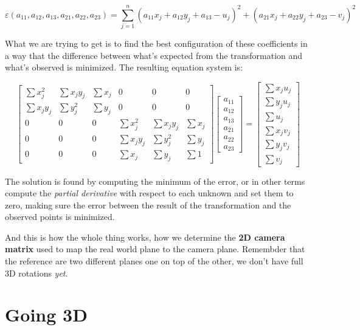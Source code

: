 \[
    \varepsilon (a_{11}, a_{12}, a_{13}, a_{21}, a_{22}, a_{23}) = 
\sum_{j=1}^{n} (a_{11}x_j + a_{12}y_j + a_{13} - u_j)^2 
+ (a_{21}x_j + a_{22}y_j + a_{23} - v_j)^2
\]


What we are trying to get is to find the best configuration of these coefficients in a way that the difference between what's expected from the transformation and what's observed is minimized. The resulting equation system is:

\[
    \begin{bmatrix}
        \sum x^2_j & \sum x_jy_j & \sum x_j & 0 & 0 & 0 \\
        \sum x_jy_j & \sum y^2_j & \sum y_j & 0 & 0 & 0 \\
        0 & 0 & 0 & \sum x^2_j & \sum x_jy_j & \sum x_j \\
        0 & 0 & 0 & \sum x_jy_j & \sum y^2_j & \sum y_j \\
        0 & 0 & 0 & \sum x_j & \sum y_j & \sum 1 
    \end{bmatrix}
    \begin{bmatrix}
        a_{11} \\
        a_{12} \\
        a_{13} \\
        a_{21} \\
        a_{22} \\
        a_{23}
    \end{bmatrix}
    =
    \begin{bmatrix}
        \sum x_ju_j \\
        \sum y_ju_j \\
        \sum u_j \\
        \sum x_jv_j \\
        \sum y_jv_j \\
        \sum v_j
    \end{bmatrix}
\]

The solution is found by computing the minimum of the error, or in other terms compute the \textit{partial derivative} with respect to each unknown and set them to zero, making sure the error between the result of the transformation and the observed points is minimized.

And this is how the whole thing works, how we determine the \textbf{2D camera matrix} used to map the real world plane to the camera plane. Remembder that the reference are two different planes one on top of the other, we don't have full 3D rotations \textit{yet}.

\section{Going 3D}

